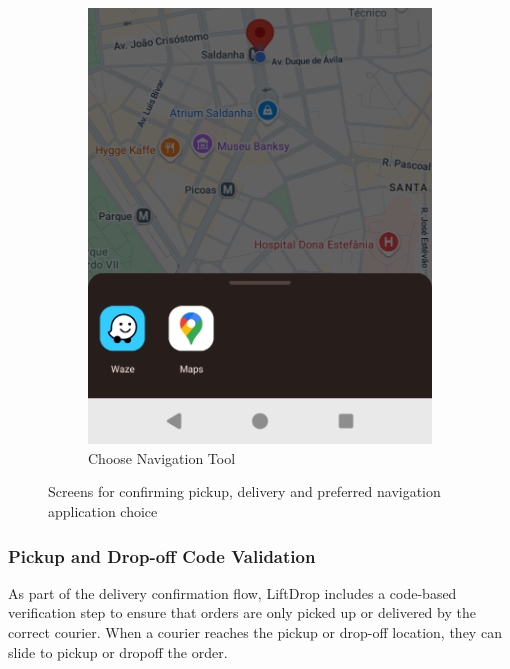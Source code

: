 \begin{figure}[H]
    \begin{subfigure}[b]{0.48\textwidth}
        \centering
        \includegraphics[width=\textwidth]{images/ChooseNavigationTool.png}
        \caption{Choose Navigation Tool}
        \label{fig:navigation_tool}
    \end{subfigure}
    \caption{Screens for confirming pickup, delivery and preferred navigation application choice }
    \label{fig:courier_request_accepted}
\end{figure}

\newpage

\subsubsection{Pickup and Drop-off Code Validation}

As part of the delivery confirmation flow, LiftDrop includes a code-based verification step to ensure that orders are only picked up or delivered by the correct courier. When a courier reaches the pickup or drop-off location, they can slide to pickup or dropoff the order.

